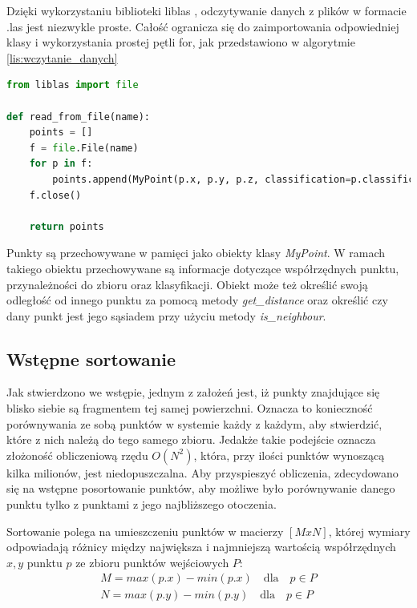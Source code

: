 Dzięki wykorzystaniu biblioteki liblas \cite{website:libLASPython}, odczytywanie danych z plików w formacie .las jest niezwykle proste.
Całość ogranicza się do zaimportowania odpowiedniej klasy i wykorzystania prostej pętli for, jak przedstawiono
w algorytmie \ref{lis:wczytanie_danych}

\begin{lstlisting}[frame=L, language=python, caption={Wczytywanie danych}, label={lis:wczytanie_danych}]
from liblas import file

def read_from_file(name):
    points = []
    f = file.File(name)
    for p in f:
        points.append(MyPoint(p.x, p.y, p.z, classification=p.classification))
    f.close()

    return points
\end{lstlisting}

Punkty są przechowywane w pamięci jako obiekty klasy \textit{MyPoint}. W ramach takiego obiektu przechowywane są informacje dotyczące
współrzędnych punktu, przynależności do zbioru oraz klasyfikacji. Obiekt może też określić swoją odległość od innego punktu
za pomocą metody \textit{get\_distance} oraz określić czy dany punkt jest jego sąsiadem przy użyciu metody \textit{is\_neighbour}.

\subsection{Wstępne sortowanie}
\label{chap:wstepne_sortowanie}

Jak stwierdzono we wstępie, jednym z założeń jest, iż punkty znajdujące się blisko siebie są fragmentem tej samej powierzchni.
Oznacza to konieczność porównywania ze sobą punktów w systemie każdy z każdym, aby stwierdzić, które z nich należą do tego samego zbioru.
Jedakże takie podejście oznacza złożoność obliczeniową rzędu $O(N^2)$, która,  przy ilości punktów wynoszącą kilka milionów, jest niedopuszczalna.
Aby przyspieszyć obliczenia, zdecydowano się na wstępne posortowanie punktów, aby możliwe było porównywanie danego punktu tylko z punktami z 
jego najbliższego otoczenia.

Sortowanie polega na umieszczeniu punktów w macierzy $[M x N]$, której wymiary odpowiadają różnicy między największa i najmniejszą wartością
współrzędnych $x, y$ punktu $p$ ze zbioru punktów wejściowych $P$:
\begin{eqnarray}
    M = max(p.x) - min(p.x) \quad \text{dla} \quad p \in P \\
    N = max(p.y) - min(p.y) \quad \text{dla} \quad p \in P
\end{eqnarray}

